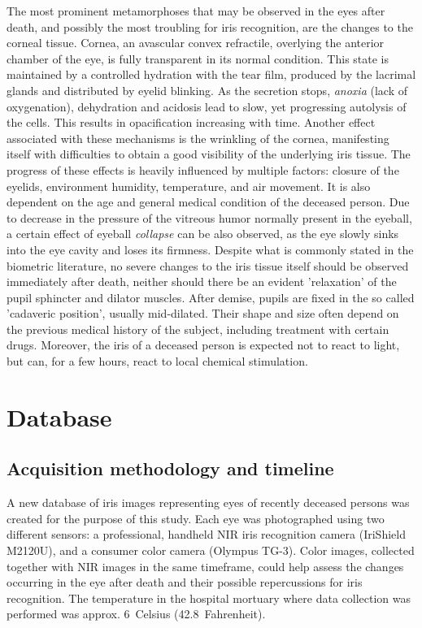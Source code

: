 \documentclass[10pt,twocolumn,letterpaper]{article}
\begin{document}
The most prominent metamorphoses that may be observed in the eyes after death, and possibly the most troubling for iris recognition, are the changes to the corneal tissue. Cornea, an avascular convex refractile, overlying the anterior chamber of the eye, is fully transparent in its normal condition. This state is maintained by a controlled hydration with the tear film, produced by the lacrimal glands and distributed by eyelid blinking. As the secretion stops, \emph{anoxia} (lack of oxygenation), dehydration and acidosis lead to slow, yet progressing autolysis of the cells. This results in opacification increasing with time. Another effect associated with these mechanisms is the wrinkling of the cornea, manifesting itself with difficulties to obtain a good visibility of the underlying iris tissue. The progress of these effects is heavily influenced by multiple factors: closure of the eyelids, environment humidity, temperature, and air movement. It is also dependent on the age and general medical condition of the deceased person. Due to decrease in the pressure of the vitreous humor normally present in the eyeball, a certain effect of eyeball \emph{collapse} can be also observed, as the eye slowly sinks into the eye cavity and loses its firmness. Despite what is commonly stated in the biometric literature, no severe changes to the iris tissue itself should be observed immediately after death, neither should there be an evident 'relaxation' of the pupil sphincter and dilator muscles. After demise, pupils are fixed in the so called 'cadaveric position', usually mid-dilated. Their shape and size often depend on the previous medical history of the subject, including treatment with certain drugs. Moreover, the iris of a deceased person is expected not to react to light, but can, for a few hours, react to local chemical stimulation.

\section{Database}
\label{sec:DataCollection}

\subsection{Acquisition methodology and timeline}

A new database of iris images representing eyes of recently deceased persons was created for the purpose of this study. Each eye was photographed using two different sensors: a professional, handheld NIR iris recognition camera (IriShield M2120U), and a consumer color camera (Olympus TG-3). Color images, collected together with NIR images in the same timeframe, could help assess the changes occurring in the eye after death and their possible repercussions for iris recognition. The temperature in the hospital mortuary where data collection was performed was approx. 6\degree~Celsius (42.8\degree~Fahrenheit).
\end{document}
